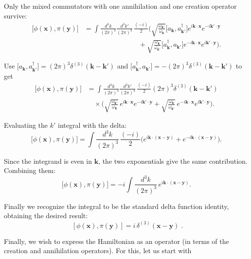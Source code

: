 \documentclass[12pt]{article}
\begin{document}
\noindent Only the mixed commutators with one annihilation and one creation operator survive:
\[
\begin{aligned}
\big[\phi(\mathbf{x}),\pi(\mathbf{y})\big]
&= \int\frac{d^3k}{(2\pi)^3}\frac{d^3k'}{(2\pi)^3}\,\frac{(-i)}{2}
\Bigg( \sqrt{\frac{\omega_{\mathbf{k}'}}{\omega_{\mathbf{k}}}}
\big[ a_{\mathbf{k}},a_{\mathbf{k}'}^\dagger\big] e^{i\mathbf{k}\cdot\mathbf{x}} e^{-i\mathbf{k}'\cdot\mathbf{y}} \\
&\qquad\qquad\qquad\qquad
+ \sqrt{\frac{\omega_{\mathbf{k}}}{\omega_{\mathbf{k}'}}}
\big[ a_{\mathbf{k}}^\dagger,a_{\mathbf{k}'}\big] e^{-i\mathbf{k}\cdot\mathbf{x}} e^{i\mathbf{k}'\cdot\mathbf{y}}
\Bigg).
\end{aligned}
\]

\noindent Use $\big[a_{\mathbf{k}},a_{\mathbf{k}'}^\dagger\big]=(2\pi)^3\delta^{(3)}(\mathbf{k}-\mathbf{k}')$
and $\big[a_{\mathbf{k}}^\dagger,a_{\mathbf{k}'}\big]=- (2\pi)^3\delta^{(3)}(\mathbf{k}-\mathbf{k}')$ to get
\[
\begin{aligned}
\big[\phi(\mathbf{x}),\pi(\mathbf{y})\big]
&= \int\frac{d^3k}{(2\pi)^3}\frac{d^3k'}{(2\pi)^3}\,\frac{(-i)}{2}(2\pi)^3\delta^{(3)}(\mathbf{k}-\mathbf{k}')\\
&\quad\times\Bigg( \sqrt{\frac{\omega_{\mathbf{k}'}}{\omega_{\mathbf{k}}}}\,e^{i\mathbf{k}\cdot\mathbf{x}} e^{-i\mathbf{k}'\cdot\mathbf{y}}
+ \sqrt{\frac{\omega_{\mathbf{k}}}{\omega_{\mathbf{k}'}}}\,e^{-i\mathbf{k}\cdot\mathbf{x}} e^{i\mathbf{k}'\cdot\mathbf{y}}
\Bigg).
\end{aligned}
\]

\noindent Evaluating the $k'$ integral with the delta:
\[
\big[\phi(\mathbf{x}),\pi(\mathbf{y})\big]
= \int\frac{d^3k}{(2\pi)^3}\,\frac{(-i)}{2}
\Big( e^{i\mathbf{k}\cdot(\mathbf{x}-\mathbf{y})} + e^{-i\mathbf{k}\cdot(\mathbf{x}-\mathbf{y})} \Big).
\]

\noindent Since the integrand is even in $\mathbf{k}$, the two exponentials
give the same contribution. Combining them:
\[
\big[\phi(\mathbf{x}),\pi(\mathbf{y})\big]
= -i \int\frac{d^3k}{(2\pi)^3}\, e^{i\mathbf{k}\cdot(\mathbf{x}-\mathbf{y})}.
\]

\noindent Finally we recognize the integral to be the standard delta function
identity, obtaining the desired result:
\[
\boxed{\;[\phi(\mathbf{x}),\pi(\mathbf{y})]= i\,\delta^{(3)}(\mathbf{x}-\mathbf{y})\; }.
\]

Finally, we wish to express the Hamiltonian as an operator (in terms of the
creation and annihilation operators). For this, let us start with 
\end{document}
